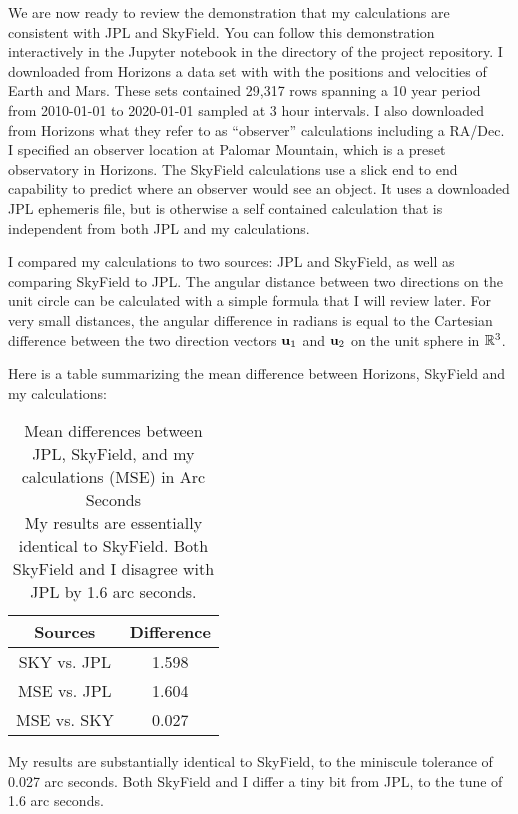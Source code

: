 We are now ready to review the demonstration that my calculations are consistent with JPL and SkyField.
You can follow this demonstration interactively in the Jupyter notebook 
 in the  directory of the project repository.
I downloaded from Horizons a data set with with the positions and velocities of Earth and Mars.
These sets contained 29,317 rows spanning a 10 year period from 2010-01-01 to 2020-01-01 sampled at 3 hour intervals.
I also downloaded from Horizons what they refer to as ``observer'' calculations including a RA/Dec.
I specified an observer location at Palomar Mountain, which is a preset observatory in Horizons.
The SkyField calculations use a slick end to end capability to predict where an observer would see an object.
It uses a downloaded JPL ephemeris file, but is otherwise a self contained calculation that is independent from both JPL and my calculations.

I compared my calculations to two sources: JPL and SkyField, as well as comparing SkyField to JPL.
The angular distance between two directions on the unit circle can be calculated with a simple formula that I will review later.  
For very small distances, the angular difference in radians is equal to the Cartesian difference between the two direction
vectors $\mathbf{u}_1$ and $\mathbf{u}_2$ on the unit sphere in $\mathbb{R}^3$.

Here is a table summarizing the mean difference between Horizons, SkyField and my calculations:
\begin{table}
\begin{centering}
\begin{tabular}{|c | c|}
\hline
Sources & Difference \\
\hline
SKY vs. JPL & 1.598 \\
MSE vs. JPL & 1.604 \\
MSE vs. SKY & 0.027 \\
\hline
\end{tabular}
\caption{Mean differences between JPL, SkyField, and my calculations (MSE) in Arc Seconds\\
My results are essentially identical to SkyField.  Both SkyField and I disagree with JPL by 1.6 arc seconds.}
\end{centering}
\end{table}
My results are substantially identical to SkyField, to the miniscule tolerance of 0.027 arc seconds.
Both SkyField and I differ a tiny bit from JPL, to the tune of 1.6 arc seconds.

